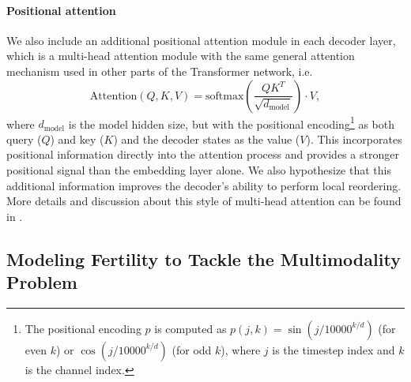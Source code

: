 \paragraph{Positional attention}
We also include an additional positional attention module in each decoder layer, which is a multi-head attention module with the same general attention mechanism used in other parts of the Transformer network, i.e.
\begin{equation}
\text{Attention}(Q,K,V)=\text{softmax}\left(\frac{QK^T}{\sqrt{d_\text{model}}}\right)\cdot V,
\label{cp8.eq.attention}
\end{equation}
where $d_\text{model}$ is the model hidden size, but with the positional encoding\footnote{The positional encoding $p$ is computed as $p(j, k) =
\sin{(j/10000^{k/d})}$ (for even $k$) or $\cos{(j/10000^{k/d})}$ (for odd $k$), where $j$ is the timestep index and $k$ is the channel index.} as both query ($Q$) and key ($K$) and the decoder states as the value ($V$). This incorporates positional information directly into the attention process and provides a stronger positional signal than the embedding layer alone. We also hypothesize that this additional information improves the decoder's ability to perform local reordering. More details and discussion about this style of multi-head attention can be found in \cite{vaswani2017attention}.

\subsection{Modeling Fertility to Tackle the Multimodality Problem}
\label{cp8.sec.fertility}

